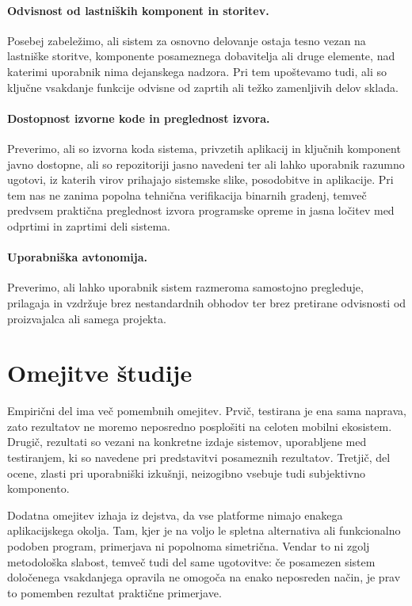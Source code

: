 \documentclass[a4paper,12pt,openright]{book}
\begin{document}
\paragraph{Odvisnost od lastniških komponent in storitev.}
Posebej zabeležimo, ali sistem za osnovno delovanje ostaja tesno vezan na lastniške storitve, komponente posameznega dobavitelja ali druge elemente, nad katerimi uporabnik nima dejanskega nadzora.
Pri tem upoštevamo tudi, ali so ključne vsakdanje funkcije odvisne od zaprtih ali težko zamenljivih delov sklada.

\paragraph{Dostopnost izvorne kode in preglednost izvora.}
Preverimo, ali so izvorna koda sistema, privzetih aplikacij in ključnih komponent javno dostopne, ali so repozitoriji jasno navedeni ter ali lahko uporabnik razumno ugotovi, iz katerih virov prihajajo sistemske slike, posodobitve in aplikacije.
Pri tem nas ne zanima popolna tehnična verifikacija binarnih gradenj, temveč predvsem praktična preglednost izvora programske opreme in jasna ločitev med odprtimi in zaprtimi deli sistema.

\paragraph{Uporabniška avtonomija.}
Preverimo, ali lahko uporabnik sistem razmeroma samostojno pregleduje, prilagaja in vzdržuje brez nestandardnih obhodov ter brez pretirane odvisnosti od proizvajalca ali samega projekta.

\section{Omejitve študije}
\label{sec:omejitve_studije}

Empirični del ima več pomembnih omejitev.
Prvič, testirana je ena sama naprava, zato rezultatov ne moremo neposredno posplošiti na celoten mobilni ekosistem.
Drugič, rezultati so vezani na konkretne izdaje sistemov, uporabljene med testiranjem, ki so navedene pri predstavitvi posameznih rezultatov.
Tretjič, del ocene, zlasti pri uporabniški izkušnji, neizogibno vsebuje tudi subjektivno komponento.

Dodatna omejitev izhaja iz dejstva, da vse platforme nimajo enakega aplikacijskega okolja.
Tam, kjer je na voljo le spletna alternativa ali funkcionalno podoben program, primerjava ni popolnoma simetrična.
Vendar to ni zgolj metodološka slabost, temveč tudi del same ugotovitve: če posamezen sistem določenega vsakdanjega opravila ne omogoča na enako neposreden način, je prav to pomemben rezultat praktične primerjave.
\end{document}
